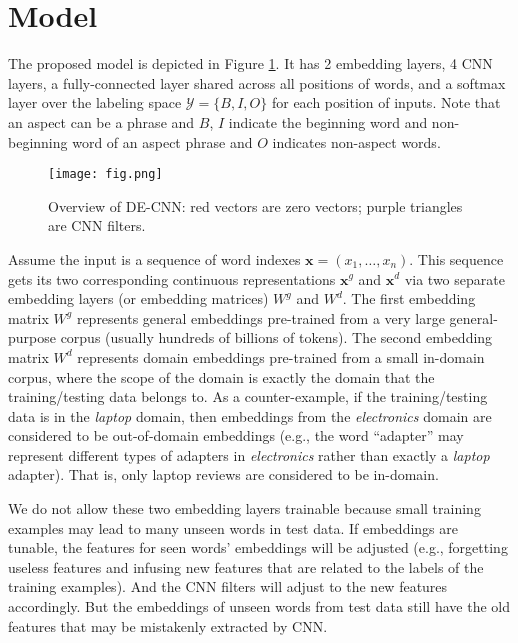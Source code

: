 \documentclass[11pt,a4paper]{article}
\begin{document}
\section{Model}
\label{sec:model}

The proposed model is depicted in Figure \ref{fig:fr}.
It has 2 embedding layers, 4 CNN layers, a fully-connected layer shared across all positions of words, and a softmax layer over the labeling space $\mathcal{Y}=\{B, I, O\}$ for each position of inputs.
Note that an aspect can be a phrase and $B$, $I$ indicate the beginning word and non-beginning word of an aspect phrase and $O$ indicates non-aspect words.

\begin{figure}[t]
\centering    
\texttt{[image: fig.png]}
    \caption{Overview of DE-CNN: red vectors are zero vectors; purple triangles are CNN filters. }
    \label{fig:fr}
\end{figure}

Assume the input is a sequence of word indexes $\mathbf{x}=(x_1, \dots, x_n)$.
This sequence gets its two corresponding continuous representations $\mathbf{x}^g$ and $\mathbf{x}^d$ via two separate embedding layers (or embedding matrices) $W^g$ and $W^d$.
The first embedding matrix $W^g$ represents general embeddings pre-trained from a very large general-purpose corpus (usually hundreds of billions of tokens).
The second embedding matrix $W^d$ represents domain embeddings pre-trained from a small in-domain corpus, where the scope of the domain is exactly the domain that the training/testing data belongs to.
As a counter-example, if the training/testing data is in the \textit{laptop} domain, then embeddings from the \textit{electronics} domain are considered to be out-of-domain embeddings (e.g., the word ``adapter'' may represent different types of adapters in \textit{electronics} rather than exactly a \textit{laptop} adapter). That is, only laptop reviews are considered to be in-domain. 

We do not allow these two embedding layers trainable because small training examples may lead to many unseen words in test data.
If embeddings are tunable, the features for seen words' embeddings will be adjusted (e.g., forgetting useless features and infusing new features that are related to the labels of the training examples).
And the CNN filters will adjust to the new features accordingly. 
But the embeddings of unseen words from test data still have the old features that may be mistakenly extracted by CNN.
\end{document}
